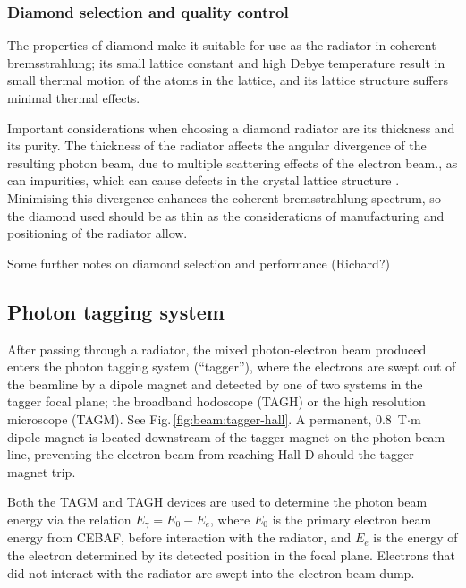\subsubsection{Diamond selection and quality control \label{sec:diamonds}}
The properties of diamond make it suitable for use as the radiator in coherent bremsstrahlung; its small lattice constant and high Debye temperature result in small thermal motion of the atoms in the lattice, and its lattice structure suffers minimal thermal effects.

Important considerations when choosing a diamond radiator are its thickness and its purity. The thickness of the radiator affects the angular divergence of the resulting photon beam, due to multiple scattering effects of the electron beam., as can impurities, which can cause defects in the crystal lattice structure \cite{YANG2010719,YANG2012}.
Minimising this divergence enhances the coherent bremsstrahlung spectrum, so the diamond used should be as thin as the considerations of manufacturing and positioning of the radiator allow.

{\color{red}Some further notes on diamond selection and performance (Richard?)}



\subsection{Photon tagging system \label{sec:tag}}
After passing through a radiator, the mixed photon-electron beam produced enters the photon tagging system (``tagger''), where the electrons are swept out of the beamline by a dipole magnet and detected by one of two systems in the tagger focal plane; the broadband hodoscope (TAGH) or the high resolution microscope (TAGM).
See Fig.\,\ref{fig:beam:tagger-hall}.
A permanent, 0.8~T$\cdot$m dipole magnet is located
downstream of the tagger magnet on the photon beam line, preventing
the electron beam from reaching Hall D should the tagger magnet trip.

Both the TAGM and TAGH devices are used to determine the photon beam energy via the relation $E_{\gamma} = E_{0} - E_{e}$, where $E_{0}$ is the primary electron beam energy from CEBAF, before interaction with the radiator, and $E_{e}$ is the energy of the electron determined by its detected position in the focal plane.
Electrons that did not interact with the radiator are swept into the electron beam dump.



